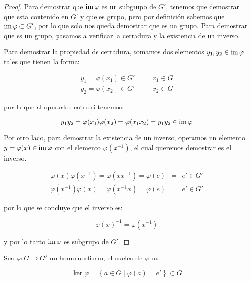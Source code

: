         \begin{proof}
            Para demostrar que $\operatorname{im}{\varphi}$ es un subgrupo de $G'$, tenemos que demostrar que esta contenido en $G'$ y que es grupo, pero por definición sabemos que $\operatorname{im}{\varphi} \subset G'$, por lo que solo nos queda demostrar que es un grupo.
            Para demostrar que es un grupo, pasamos a verificar la cerradura y la existencia de un inverso.

            Para demostrar la propiedad de cerradura, tomamos dos elementos $y_1, y_2 \in \operatorname{im}{\varphi}$ tales que tienen la forma:

            \begin{eqnarray*}
                y_1 = \varphi(x_1) \in G' & \quad & x_1 \in G \\
                y_2 = \varphi(x_2) \in G' & \quad & x_2 \in G
            \end{eqnarray*}

            por lo que al operarlos entre si tenemos:

            \begin{equation*}
                y_1 y_2 = \varphi(x_1) \varphi(x_2) = \varphi(x_1 x_2) = y_1 y_2 \in \operatorname{im}{\varphi}
            \end{equation*}

            Por otro lado, para demostrar la existencia de un inverso, operamos un elemento $y = \varphi(x) \in \operatorname{im}{\varphi}$ con el elemento $\varphi(x^{-1})$, el cual queremos demostrar es el inverso.

            \begin{eqnarray*}
                \varphi(x) \varphi(x^{-1}) = \varphi(x x^{-1}) = \varphi(e) & = & e' \in G' \\
                \varphi(x^{-1}) \varphi(x) = \varphi(x^{-1} x) = \varphi(e) & = & e' \in G'
            \end{eqnarray*}

            por lo que se concluye que el inverso es:

            \begin{equation*}
                \varphi(x)^{-1} = \varphi(x^{-1})
            \end{equation*}

            y por lo tanto $\operatorname{im}{\varphi}$ es subgrupo de $G'$.
        \end{proof}

        \begin{definicion}
            Sea $\varphi \colon G \to G'$ un homomorfismo, el nucleo de $\varphi$ es:

            \begin{equation}
                \ker{\varphi} = \left\{ a \in G \mid \varphi(a) = e' \right\} \subset G
            \end{equation}
        \end{definicion}

